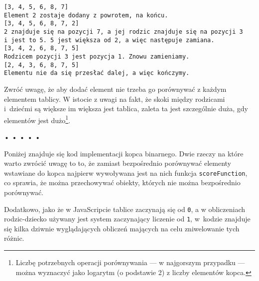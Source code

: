  \begin{verbatim} 
[3, 4, 5, 6, 8, 7]
Element 2 zostaje dodany z powrotem, na końcu.
[3, 4, 5, 6, 8, 7, 2]
2 znajduje się na pozycji 7, a jej rodzic znajduje się na pozycji 3 
i jest to 5. 5 jest większa od 2, a więc następuje zamiana.
[3, 4, 2, 6, 8, 7, 5]
Rodzicem pozycji 3 jest pozycja 1. Znowu zamieniamy.
[2, 4, 3, 6, 8, 7, 5]
Elementu nie da się przesłać dalej, a więc kończymy.
 \end{verbatim}
  
Zwróć uwagę, że aby dodać element nie trzeba go porównywać z każdym elementem tablicy. W istocie z uwagi na fakt, że skoki między rodzicami i~dziećmi są większe im większa jest tablica, zaleta ta jest szczególnie duża, gdy elementów jest dużo\footnote{Liczbę potrzebnych operacji porównywania — w najgorszym przypadku — można wyznaczyć jako logarytm (o podstawie 2) z liczby elementów kopca.}.


\begin{center} 
 • • • • • 
 \end{center}

  
Poniżej znajduje się kod implementacji kopca binarnego. Dwie rzeczy na które warto zwrócić uwagę to to, że zamiast bezpośrednio porównywać elementy wstawiane do kopca najpierw wywoływana jest na nich funkcja \texttt{scoreFunction}, co sprawia, że można przechowywać obiekty, których nie można bezpośrednio porównywać.

  
Dodatkowo, jako że w JavaScripcie tablice zaczynają się od \texttt{0}, a w obliczeniach rodzic-dziecko używany jest system zaczynający liczenie od \texttt{1}, w~kodzie znajduje się kilka dziwnie wyglądających obliczeń mających na celu zniwelowanie tych różnic.


